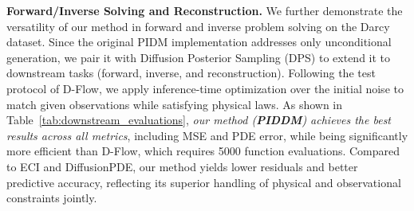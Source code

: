 \documentclass{article}
\theoremstyle{plain}
\theoremstyle{definition}
\theoremstyle{remark}
\begin{document}
\noindent\textbf{Forward/Inverse Solving and Reconstruction.}
We further demonstrate the versatility of our method in forward and inverse problem solving on the Darcy dataset. Since the original PIDM \cite{bastek2025pdim} implementation addresses only unconditional generation, we pair it with Diffusion Posterior Sampling (DPS) \cite{chung2022dps} to extend it to downstream tasks (forward, inverse, and reconstruction). Following the test protocol of D-Flow, we apply inference-time optimization over the initial noise to match given observations while satisfying physical laws. As shown in Table~\ref{tab:downstream_evaluations}, \emph{our method (\textbf{PIDDM}) achieves the best results across all metrics}, including MSE and PDE error, while being significantly more efficient than D-Flow, which requires 5000 function evaluations. Compared to ECI and DiffusionPDE, our method yields lower residuals and better predictive accuracy, reflecting its superior handling of physical and observational constraints jointly.
\end{document}
